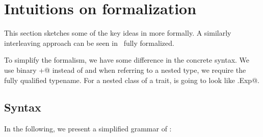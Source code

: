\saveSpace\saveSpace\section{Intuitions on formalization}\label{sec:formal}
\saveSpace\saveSpace

This section sketches some of the key ideas in \name more
formally. A similarly interleaving approach can be seen in~\cite{servetto2014meta} fully formalized.

To simplify the formalism, 
 we have some difference in the concrete syntax.
We use binary \Q@+@ instead of \use
and when referring to a nested type, we require the fully
qualified typename. For a nested class of a trait,
is going to look like \Q@This.Exp@.


\subsection{Syntax}

In the following, we present a simplified grammar of \name:

\begin{bnf}
\prodFull{}\\
\prodFull{}\\
\prodFull{}\\
\prodFull{}\\
\prodFull{}\\
\prodFull{}\\

\prodFull{}\\
\prodFull{}\\
\end{bnf}

